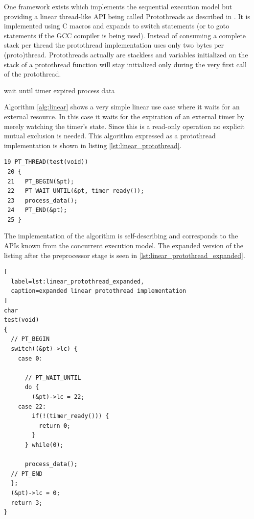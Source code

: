One framework exists which implements the sequential execution model but providing a linear thread-like API being called Protothreads as described in \cite{dunkels}. It is implemented using C macros and expands to switch statements (or to goto statements if the GCC compiler is being used). Instead of consuming a complete stack per thread the protothread implementation uses only two bytes per (proto)thread. Protothreads actually are stackless and variables initialized on the stack of a protothread function will stay initialized only during the very first call of the protothread.

\begin{algorithm}[H]
\caption{Simple linear algorithm}
\label{alg:linear}
\begin{algorithmic}
    \STATE wait until timer expired
    \STATE process data
\ENDWHILE
\end{algorithmic}
\end{algorithm}

Algorithm \ref{alg:linear} shows a very simple linear use case where it waits for an external resource. In this case it waits for the expiration of an external timer by merely watching the timer's state. Since this is a read-only operation no explicit mutual exclusion is needed. This algorithm expressed as a protothread implementation is shown in listing \ref{lst:linear_protothread}.

\begin{lstlisting}[label=lst:linear_protothread,caption=linear protothread implementation]
 19 PT_THREAD(test(void))
 20 {
 21   PT_BEGIN(&pt);
 22   PT_WAIT_UNTIL(&pt, timer_ready());
 23   process_data();
 24   PT_END(&pt);
 25 }
\end{lstlisting}

The implementation of the algorithm is self-describing and corresponds to the APIs known from the concurrent execution model. The expanded version of the listing after the preprocessor stage is seen in \ref{lst:linear_protothread_expanded}.

\begin{lstlisting}[
  label=lst:linear_protothread_expanded,
  caption=expanded linear protothread implementation
]
char
test(void)
{
  // PT_BEGIN
  switch((&pt)->lc) {
    case 0:

      // PT_WAIT_UNTIL
      do {
        (&pt)->lc = 22;
    case 22:
        if(!(timer_ready())) {
          return 0;
        }
      } while(0);

      process_data();
  // PT_END
  };
  (&pt)->lc = 0;
  return 3;
}
\end{lstlisting}

